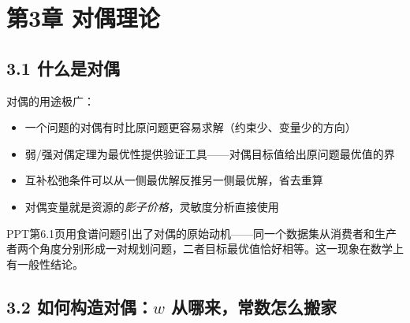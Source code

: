\section{第3章 \quad 对偶理论}

\subsection{3.1 什么是对偶}


对偶的用途极广：
\begin{itemize}
  \item 一个问题的对偶有时比原问题更容易求解（约束少、变量少的方向）
  \item 弱/强对偶定理为最优性提供验证工具——对偶目标值给出原问题最优值的界
  \item 互补松弛条件可以从一侧最优解反推另一侧最优解，省去重算
  \item 对偶变量就是资源的\emph{影子价格}，灵敏度分析直接使用
\end{itemize}

\medskip
PPT第6.1页用食谱问题引出了对偶的原始动机——同一个数据集从消费者和生产者两个角度分别形成一对规划问题，二者目标最优值恰好相等。这一现象在数学上有一般性结论。
\medskip

\subsection{3.2 如何构造对偶：$w$ 从哪来，常数怎么搬家}

